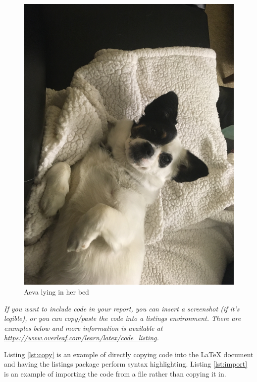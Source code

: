 \documentclass[12pt]{article}
\begin{document}
\begin{figure}[h!]
    \centering
    \includegraphics[trim=0 20 10 50, clip, width=\textwidth] {aeva-bed.jpg}
    \caption{Aeva lying in her bed}
    \label{fig:aeva-bed}
\end{figure}

\emph{If you want to include code in your report, you can insert a screenshot (if it's legible), or you can copy/paste the code into a listings environment. There are examples below and more information is available at \url{https://www.overleaf.com/learn/latex/code_listing}.}

Listing \ref{lst:copy} is an example of directly copying code into the LaTeX document and having the listings package perform syntax highlighting. Listing \ref{lst:import} is an example of importing the code from a file rather than copying it in.
\end{document}
